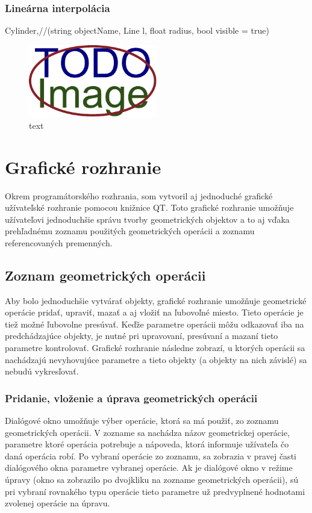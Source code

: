 \subsection{Lineárna interpolácia}
Cylinder,//(string objectName, Line l, float radius, bool visible = true)

\begin{figure}[H]
	\centering
	\includegraphics[width=0.5\textwidth]{obrazky-figures/placeholder.pdf}
	\caption{text}
	\label{fig:1}
\end{figure}




\chapter{Grafické rozhranie}
Okrem programátorského rozhrania, som vytvoril aj jednoduché grafické užívateľské rozhranie pomocou knižnice QT. Toto grafické rozhranie umožňuje užívateľovi jednoduchšie správu tvorby geometrických objektov a to aj vďaka prehľadnému zoznamu použitých geometrických operácii a zoznamu referencovaných premenných. 

\section{Zoznam geometrických operácii}
Aby bolo jednoduchšie vytvárať objekty, grafické rozhranie umožňuje geometrické operácie pridať, upraviť, mazať a aj vložiť na ľubovoľné miesto. Tieto operácie je tiež možné ľubovolne presúvať. Keďže parametre operácii môžu odkazovať iba na predchádzajúce objekty, je nutné pri upravovaní, presúvaní a mazaní tieto parametre kontrolovať. Grafické rozhranie následne zobrazí, u ktorých operácii sa nachádzajú nevyhovujúce parametre a tieto objekty (a objekty na nich závislé) sa nebudú vykresľovať.



\subsection{Pridanie, vloženie a úprava geometrických operácii} 
Dialógové okno umožňuje výber operácie,  ktorá sa má použiť, zo zoznamu geometrických operácii. V zozname sa nachádza názov geometrickej operácie, parametre ktoré operácia potrebuje a nápoveda, ktorá informuje užívateľa čo daná operácia robí.
Po vybraní operácie zo zoznamu, sa zobrazia v pravej časti dialógového okna parametre vybranej operácie. Ak je dialógové okno v režime úpravy (okno sa zobrazilo po dvojkliku na zozname geometrických operácii), sú pri vybraní rovnakého typu operácie tieto parametre už predvyplnené hodnotami zvolenej operácie na úpravu.

